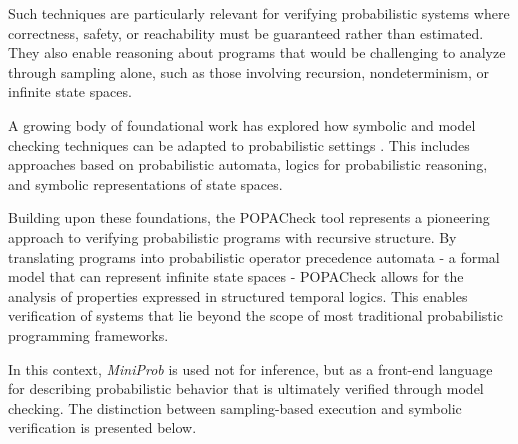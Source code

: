 Such techniques are particularly relevant for verifying probabilistic systems where correctness, safety, or reachability must be guaranteed rather than estimated.
They also enable reasoning about programs that would be challenging to analyze through sampling alone, such as those involving recursion, nondeterminism, or infinite state
spaces.

A growing body of foundational work has explored how symbolic and model checking techniques can be adapted to probabilistic
settings \cite{BaierClarkeHartonasGarmhausenKwiatkowskaRyan1997,EsparzaKuceraMayr2006,EtessamiYannakakis2012}. This includes approaches based on probabilistic automata, logics for probabilistic reasoning, and
symbolic representations of state spaces.

Building upon these foundations, the POPACheck tool \cite{POPACheck} represents a pioneering approach to verifying probabilistic programs with recursive structure.
By translating programs into probabilistic operator precedence automata - a formal model that can represent infinite state spaces - POPACheck allows for the analysis
of properties expressed in structured temporal logics. This enables verification of systems that lie beyond the scope of most traditional probabilistic programming
frameworks.

In this context, \emph{MiniProb} is used not for inference, but as a front-end language for describing probabilistic behavior that is ultimately verified through
model checking. The distinction between sampling-based execution and symbolic verification is presented below.

